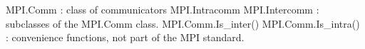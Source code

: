 MPI.Comm            : class of communicators
MPI.Intracomm
MPI.Intercomm       : subclasses of the MPI.Comm class.
MPI.Comm.Is_inter()
MPI.Comm.Is_intra() : convenience functions, not part of the MPI standard.
